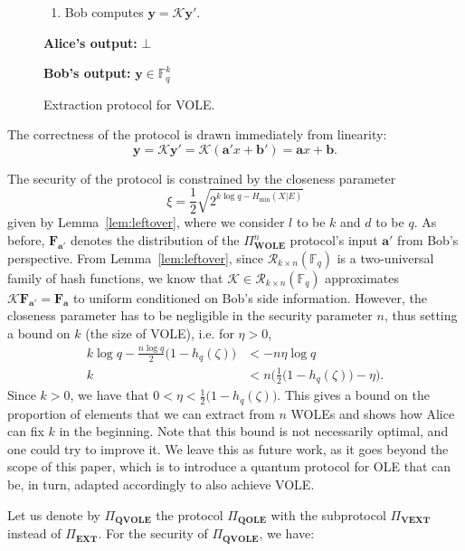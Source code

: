 \begin{figure}[h!]
\begin{tcolorbox}
\begin{enumerate}
    \item Bob computes $\bm{y} = \mathcal{K}\bm{y}'$.
\end{enumerate}

\textbf{Alice's output:} $\bot$

\textbf{Bob's output:} $\bm{y}\in \mathbb{F}^k_q$
        
        \end{tcolorbox}
\caption{Extraction protocol  for VOLE.}
\label{fig:vext}
\end{figure}


The correctness of the protocol is drawn immediately from linearity:
\begin{equation*}
\bm{y} = \mathcal{K} \bm{y}'
= \mathcal{K}(\bm{a}'x + \bm{b}')
= \bm{a}x + \bm{b}.
\end{equation*}

The security of the protocol is constrained by the closeness parameter $$\xi = \frac{1}{2}\sqrt{2^{k\log q - H_\text{min}(X|E)}}$$ given by Lemma~\ref{lem:leftover}, where we consider $l$ to be $k$ and $d$ to be $q$. As before, $\mathbf{F}_{\bm{a}'}$ denotes the distribution of the $\Pi^n_{\textbf{WOLE}}$ protocol's input ${\bm{a}'}$ from Bob's perspective. From Lemma~\ref{lem:leftover}, since $\mathcal{R}_{k\times n}(\mathbb{F}_q)$ is a two-universal family of hash functions, we know that $\mathcal{K}\in \mathcal{R}_{k\times n}(\mathbb{F}_q)$ approximates $\mathcal{K}\mathbf{F}_{\bm{a}'} = \mathbf{F}_{\bm{a}}$ to uniform conditioned on Bob's side information. However, the closeness parameter has to be negligible in the security parameter $n$, thus setting a bound on $k$ (the size of VOLE), i.e. for $\eta > 0$,
\begin{align*}
k \log q - \frac{n \log q}{2}\big(1-h_{q}(\zeta)\big) &< -n \eta \log q\\
k &< n \Big(\frac{1}{2}\big(1-h_q(\zeta)\big) - \eta\Big).
\end{align*}
Since $k>0$, we have that  $ 0 < \eta < \frac{1}{2}\big(1-h_q(\zeta)\big)$. This gives a bound on the proportion of elements that we can extract from $n$ WOLEs  and  shows how Alice can fix $k$ in the beginning.  Note that this bound is not necessarily optimal, and one could try to improve it. We leave this as future work, as it goes beyond the scope of this paper, which is to introduce a quantum protocol for OLE that can be, in turn, adapted accordingly to also achieve VOLE.

Let us denote by $\Pi_{\textbf{QVOLE}}$ the protocol $\Pi_{\textbf{QOLE}}$ with the subprotocol $\Pi_{\textbf{VEXT}}$ instead of $\Pi_{\textbf{EXT}}$. For the security of $\Pi_{\textbf{QVOLE}}$, we have:

